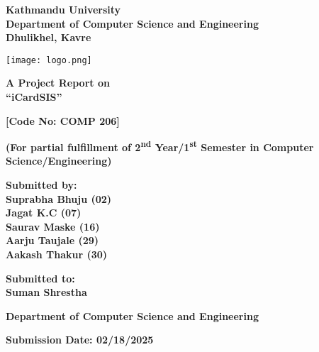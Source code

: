 \documentclass[a4paper,14pt]{article}
\begin{document}
	
	\begin{center}
		{\Large \textbf{Kathmandu University}} \\
		{\Large \textbf{Department of Computer Science and Engineering}} \\
		{\Large \textbf{Dhulikhel, Kavre}}  
		\vspace{1.5cm}
		
		\texttt{[image: logo.png]} 
		\vspace{1.5cm}
		
		{\Large \textbf{A Project Report on}} \\  
		{\Large \textbf{``iCardSIS''}}  
		\vspace{1cm}
		
		{\Large \textbf{[Code No: COMP 206]}}  
		\vspace{1cm}
		
		{\Large \textbf{(For partial fulfillment of 2\textsuperscript{nd} Year/1\textsuperscript{st} Semester in Computer Science/Engineering)}}  
		\vspace{1cm}
		
		{\Large \textbf{Submitted by:}} \\
		{\Large \textbf{Suprabha Bhuju (02)}} \\
		{\Large \textbf{Jagat K.C (07)}} \\
		{\Large \textbf{Saurav Maske (16)}} \\
		{\Large \textbf{Aarju Taujale (29)}} \\
		{\Large \textbf{Aakash Thakur (30)}}  
		\vspace{1cm}
		
		{\Large \textbf{Submitted to:}}\\
		\vspace{1cm}  
		{\Large \textbf{Suman Shrestha}}  
		\vspace{1cm}
		
		{\Large \textbf{Department of Computer Science and Engineering}}  
		\vspace{1cm}
		
		{\Large \textbf{Submission Date: 02/18/2025}}  
	\end{center}
	
	\newpage  
	
	\vspace{0.5cm}
	
\end{document}
